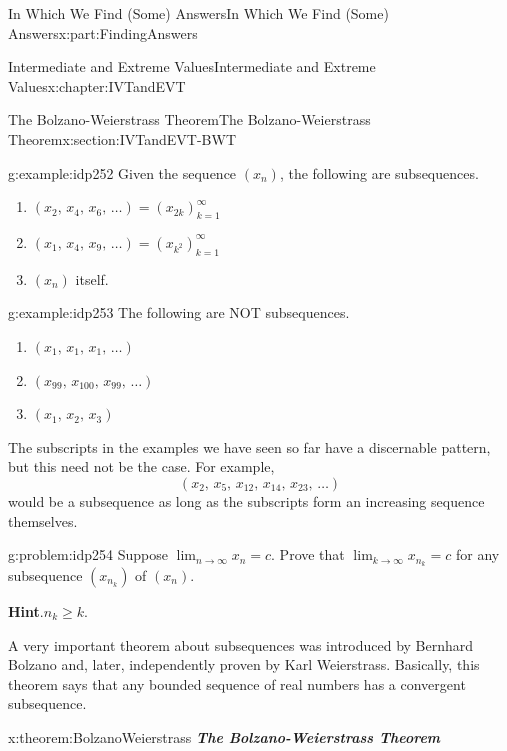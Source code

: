\documentclass[oneside,10pt,]{book}
\newcommand{\blocktitlefont}{\relax}
\newcommand{\alert}[1]{\textbf{\textit{#1}}}
\numberwithin{equation}{section}
\begin{document}
\begin{partptx}{In Which We Find (Some) Answers}{}{In Which We Find (Some) Answers}{}{}{x:part:FindingAnswers}
\begin{chapterptx}{Intermediate and Extreme Values}{}{Intermediate and Extreme Values}{}{}{x:chapter:IVTandEVT}
\begin{sectionptx}{The Bolzano-Weierstrass Theorem}{}{The Bolzano-Weierstrass Theorem}{}{}{x:section:IVTandEVT-BWT}
\begin{example}{}{g:example:idp252}%
Given the sequence \(\left(x_n\right)\), the following are subsequences.%
\begin{enumerate}[font=\bfseries,label=(\alph*),ref=\alph*]
\item{}\(\left(x_2,\,x_4,\,x_6,\,\ldots\right)=\left(x_{2k}\right)_{k=1}^\infty\)%
\item{}\(\left(x_1,\,x_4,\,x_9,\,\ldots\right)=\left(x_{k^2}\right)_{k=1}^ \infty\)%
\item{}\(\left(x_n\right)\) itself.%
\end{enumerate}
\end{example}
\begin{example}{}{g:example:idp253}%
The following are NOT subsequences.%
\begin{enumerate}[font=\bfseries,label=(\alph*),ref=\alph*]
\item{}\(\left(x_1,\,x_1,\,x_1,\,\ldots\right)\)%
\item{}\(\left(x_{99},\,x_{100},\,x_{99},\,\ldots\right)\)%
\item{}\(\left(x_1,\,x_2,\,x_3\right)\)%
\end{enumerate}
\end{example}
The subscripts in the examples we have seen so far have a discernable pattern, but this need not be the case. For example,%
\begin{equation*}
\left(x_2,\,x_5,\,x_{12},\,x_{14},\,x_{23},\,\ldots\right)
\end{equation*}
would be a subsequence as long as the subscripts form an increasing sequence themselves.%
\begin{problem}{}{g:problem:idp254}%
 Suppose \(\lim_{n\rightarrow\infty}x_n=c\). Prove that \(\lim_{k\rightarrow\infty}x_{n_k}=c\) for any subsequence \(\left(x_{n_k}\right)\) of \(\left(x_n\right)\).%
\par\smallskip%
\noindent\textbf{\blocktitlefont Hint}.\hypertarget{g:hint:idp255}{}\quad{}\(n_k\geq k\).%
\end{problem}
A very important theorem about subsequences was introduced by Bernhard Bolzano  and, later, independently proven  by Karl Weierstrass. Basically, this theorem says that any bounded sequence of real numbers has a convergent subsequence.%
\begin{theorem}{}{}{x:theorem:BolzanoWeierstrass}%
\alert{The Bolzano-Weierstrass Theorem}%
\par

\end{theorem}
\end{sectionptx}
\end{chapterptx}
\end{partptx}
\end{document}
